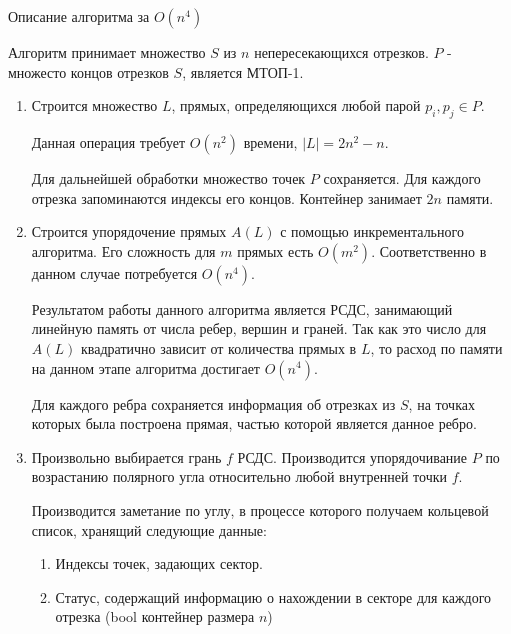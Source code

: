 \documentclass[letterpaper,12pt]{article}
\begin{document}
\begin{center}
Описание алгоритма за $O(n^4)$
\end{center}
\par
Алгоритм принимает множество $S$ из $n$ непересекающихся отрезков.
$P$ - множесто концов отрезков $S$, является МТОП-1.
\begin{enumerate}
      \item Строится множество $L$, прямых, определяющихся любой парой 
            $p_i, p_j \in P$.
            \par
            Данная операция требует $O(n^2)$ времени, $|L| = 2n^2-n$.
            \par
            Для дальнейшей обработки множество точек $P$ сохраняется.
            Для каждого отрезка запоминаются индексы его концов.
            Контейнер занимает $2n$ памяти.
      \item Строится упорядочение прямых $A(L)$ с помощью 
            инкрементального алгоритма. Его сложность для $m$ прямых
            есть $O(m^2)$. Соответственно в данном случае потребуется
            $O(n^4)$.
            \par
            Результатом работы данного алгоритма является РСДС,
            занимающий линейную память от числа ребер, вершин и граней.
            Так как это число для $A(L)$ квадратично зависит от количества
            прямых в $L$, то расход по памяти на данном этапе алгоритма 
            достигает $O(n^4)$.
            \par
            Для каждого ребра сохраняется информация об отрезках из $S$,
            на точках которых была построена прямая, 
            частью которой является данное ребро.
      \item Произвольно выбирается грань $f$ РСДС. Производится 
            упорядочивание $P$ по возрастанию полярного угла относительно 
            любой внутренней точки $f$.
            \par
            Производится заметание по углу, в процессе которого получаем
            кольцевой список, хранящий следующие данные:
            \begin{enumerate}
                  \item Индексы точек, задающих сектор. 
                  \item Статус, содержащий информацию о нахождении в секторе
                        для каждого отрезка (bool контейнер размера $n$)
            \end{enumerate}
            \par

\end{enumerate}
\end{document}
